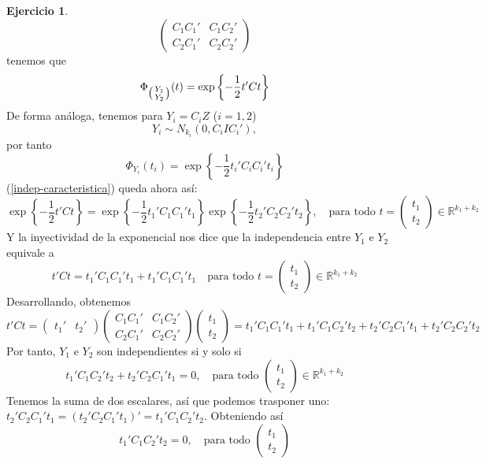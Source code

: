 \documentclass[12pt,spanish]{article}
\theoremstyle{definition}
\newtheorem{exercise}{Ejercicio}
\begin{document}
\begin{exercise}
\[\begin{pmatrix}
      C_1 C_1' & C_1 C_2' \\ C_2 C_1' & C_2 C_2'
    \end{pmatrix}\]
  tenemos que \[\Phi_{
      \begin{psmallmatrix}
        Y_1 \\ Y_2
      \end{psmallmatrix}
    }(t)=\exp\left\{-\frac{1}{2}t'Ct\right\}\]
  De forma análoga, tenemos para $Y_i=C_i Z$ ($i=1,2$)
  \[Y_i\sim N_{k_i}(0,C_i I C_i'),\] por tanto
  \[\Phi_{Y_i}(t_i)=\exp\left\{-\frac{1}{2}t_i'C_iC_i't_i\right\}\]
  (\ref{indep-caracteristica}) queda ahora así:
  \[\exp\left\{-\frac{1}{2}t'Ct\right\}=\exp\left\{-\frac{1}{2}t_1'C_1C_1't_1\right\}\exp\left\{-\frac{1}{2}t_2'C_2C_2't_2\right\},\quad\text{para todo } t=\begin{pmatrix}
      t_1 \\ t_2
    \end{pmatrix}\in\mathbb{R}^{k_1+k_2}\]
  Y la inyectividad de la exponencial nos dice que la independencia
  entre $Y_1$ e $Y_2$ equivale a
  \[t'Ct=t_1'C_1C_1't_1+t_1'C_1C_1't_1\quad\text{para todo }
    t=\begin{pmatrix} t_1 \\ t_2
    \end{pmatrix}\in\mathbb{R}^{k_1+k_2}\]
  Desarrollando, obtenemos
  \[t'Ct=
    \begin{pmatrix}
      t_1' & t_2'
    \end{pmatrix}
    \begin{pmatrix}
      C_1 C_1' & C_1 C_2' \\ C_2 C_1' & C_2 C_2'
    \end{pmatrix}
    \begin{pmatrix}
      t_1 \\ t_2
    \end{pmatrix}=t_1'C_1C_1't_1+t_1'C_1C_2't_2+t_2'C_2C_1't_1+t_2'C_2C_2't_2\]
  Por tanto, $Y_1$ e $Y_2$ son independientes si y solo si
  \[t_1'C_1C_2't_2+t_2'C_2C_1't_1=0,\quad\text{para todo }
    \begin{pmatrix} t_1 \\ t_2
    \end{pmatrix}\in\mathbb{R}^{k_1+k_2}\]
  Tenemos la suma de dos escalares, así que podemos trasponer uno:
  $t_2'C_2C_1't_1=(t_2'C_2C_1't_1)'=t_1'C_1C_2't_2$. Obteniendo así \begin{equation} \label{indep-condition} t_1'C_1C_2't_2=0,\quad\text{para todo }
    \begin{pmatrix} t_1 \\ t_2

\end{pmatrix}
\end{equation}
\end{exercise}
\end{document}
